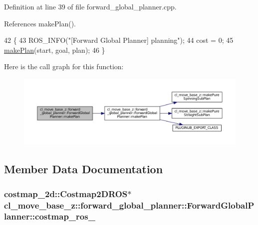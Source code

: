 Definition at line 39 of file forward\+\_\+global\+\_\+planner.\+cpp.



References make\+Plan().


\begin{DoxyCode}
42 \{
43     ROS\_INFO(\textcolor{stringliteral}{"[Forward Global Planner] planning"});
44     cost = 0;
45     \hyperlink{classcl__move__base__z_1_1forward__global__planner_1_1ForwardGlobalPlanner_a9d7c48877a390ca3cc580a7ffa50d316}{makePlan}(start, goal, plan);
46 \}
\end{DoxyCode}


Here is the call graph for this function\+:
\nopagebreak
\begin{figure}[H]
\begin{center}
\leavevmode
\includegraphics[width=350pt]{classcl__move__base__z_1_1forward__global__planner_1_1ForwardGlobalPlanner_ab01769603169105e92d9b6e479147bce_cgraph}
\end{center}
\end{figure}




\subsection{Member Data Documentation}
\subsubsection[{\texorpdfstring{costmap\+\_\+ros\+\_\+}{costmap_ros_}}]{\setlength{\rightskip}{0pt plus 5cm}costmap\+\_\+2d\+::\+Costmap2\+D\+R\+OS$\ast$ cl\+\_\+move\+\_\+base\+\_\+z\+::forward\+\_\+global\+\_\+planner\+::\+Forward\+Global\+Planner\+::costmap\+\_\+ros\+\_\+\hspace{0.3cm}{\ttfamily [private]}}\hypertarget{classcl__move__base__z_1_1forward__global__planner_1_1ForwardGlobalPlanner_a711d4a0d92a216eb8cab3b42f18eb795}{}\label{classcl__move__base__z_1_1forward__global__planner_1_1ForwardGlobalPlanner_a711d4a0d92a216eb8cab3b42f18eb795}


